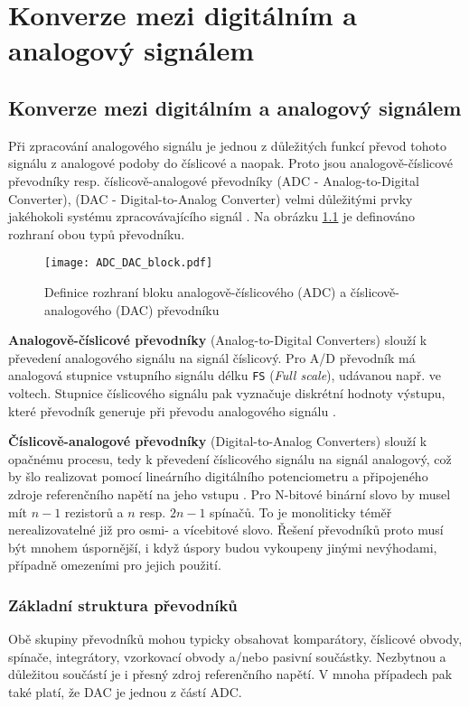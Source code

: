 \chapter{Konverze mezi digitálním a analogový sig\-ná\-lem}
\minitoc
\newpage
\section{Konverze mezi digitálním a analogový signálem}
  Při zpracování analogového signálu je jednou z důležitých funkcí převod tohoto signálu z analogové podoby do číslicové a naopak. Proto jsou analogově-číslicové převodníky resp. číslicově-analogové převodníky (ADC - Analog-to-Digital Converter), (DAC - Digital-to-Analog Converter) velmi důležitými prvky jakéhokoli systému zpracovávajícího signál \cite[s.~11]{Haze}. Na obrázku \ref{AES:fig_ADC_DAC_IO} je definováno rozhraní obou typů převodníku.
  \begin{figure}[ht!]
     \centering
     \texttt{[image: ADC\_DAC\_block.pdf]}
     \caption[Definice I/O bloku DAC a ADC ]{Definice rozhraní bloku analogově-číslicového (ADC) a číslicově-analogového (DAC) převodníku}
     \label{AES:fig_ADC_DAC_IO}
  \end{figure}

  \textbf{Analogově-číslicové převodníky} (Analog-to-Digital Converters) slouží k pře\-ve\-de\-ní analogového 
  signálu na signál číslicový. Pro A/D převodník má analogová stupnice vstupního signálu délku \texttt{FS} 
  (\emph{Full scale}), udávanou např. ve voltech. Stupnice číslicového signálu pak vyznačuje diskrétní 
  hodnoty výstupu, které převodník generuje při převodu analogového signálu \cite[s.~202]{Neumann}.

  \textbf{Číslicově-analogové převodníky} (Digital-to-Analog Converters) slouží k o\-pač\-né\-mu procesu, 
  tedy k pře\-ve\-de\-ní číslicového signálu na signál analogový, což by šlo realizovat pomocí lineárního 
  digitálního potenciometru a připojeného zdroje referenčního napětí na jeho vstupu \cite[s.~208]{Neumann}. 
  Pro N-bitové binární slovo by musel mít $n-1$ rezistorů a $n$ resp. $2n - 1$ spínačů. To je monoliticky 
  téměř nerealizovatelné již pro osmi- a vícebitové slovo. Řešení převodníků proto musí být mnohem 
  úspornější, i když úspory budou vykoupeny jinými nevýhodami, případně omezeními pro jejich použití.

    \subsection{Základní struktura převodníků}
      Obě skupiny převodníků mohou typicky obsahovat komparátory, číslicové obvody, spínače, integrátory,  
      vzorkovací obvody a/nebo pasivní součástky. Nezbytnou a důležitou součástí je i přesný zdroj 
      referenčního napětí. V mnoha případech pak také platí, že DAC je jednou z částí ADC.
      
